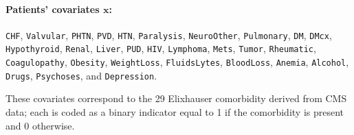 \documentclass[12pt,a4paper]{article}
\newcommand{\bx}{\mathbf{x}}
\begin{document}
\paragraph{\bf Patients' covariates $\bx$:} \texttt{CHF}, \texttt{Valvular}, \texttt{PHTN}, \texttt{PVD}, \texttt{HTN}, \texttt{Paralysis}, \texttt{NeuroOther}, \texttt{Pulmonary}, 
\texttt{DM}, \texttt{DMcx}, \texttt{Hypothyroid}, \texttt{Renal}, \texttt{Liver}, \texttt{PUD}, \texttt{HIV}, \texttt{Lymphoma}, \texttt{Mets}, \texttt{Tumor}, \texttt{Rheumatic}, 
\texttt{Coagulopathy}, \texttt{Obesity}, \texttt{WeightLoss}, \texttt{FluidsLytes}, \texttt{BloodLoss}, \texttt{Anemia}, \texttt{Alcohol}, \texttt{Drugs}, 
\texttt{Psychoses}, and \texttt{Depression}. 

These covariates correspond to the 29 Elixhauser comorbidity derived from CMS data; each is coded as a binary indicator equal to 1 if the comorbidity is present and 0 otherwise.
\end{document}
